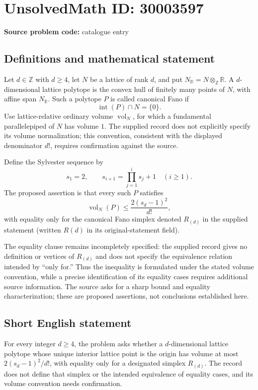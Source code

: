 \documentclass[11pt]{article}
\newcommand{\Z}{\mathbb{Z}}
\newcommand{\R}{\mathbb{R}}
\begin{document}
\section*{UnsolvedMath ID: 30003597}
\textbf{Source problem code:} catalogue entry
\subsection{Definitions and mathematical statement}
Let \(d\in\Z\) with \(d\geq4\), let \(N\) be a lattice of rank \(d\), and put \(N_{\R}=N\otimes_{\Z}\R\). A \(d\)-dimensional lattice polytope is the convex hull of finitely many points of \(N\), with affine span \(N_{\R}\). Such a polytope \(P\) is called canonical Fano if
\[
\operatorname{int}(P)\cap N=\{0\}.
\]
Use lattice-relative ordinary volume \(\operatorname{vol}_N\), for which a fundamental parallelepiped of \(N\) has volume \(1\). The supplied record does not explicitly specify its volume normalization; this convention, consistent with the displayed denominator \(d!\), requires confirmation against the source.

Define the Sylvester sequence by
\[
s_1=2,\qquad s_{i+1}=\prod_{j=1}^{i}s_j+1\quad(i\geq1).
\]
The proposed assertion is that every such \(P\) satisfies
\[
\operatorname{vol}_N(P)\leq\frac{2(s_d-1)^2}{d!},
\]
with equality only for the canonical Fano simplex denoted \(R_{(d)}\) in the supplied statement (written \(R(d)\) in its original-statement field).

The equality clause remains incompletely specified: the supplied record gives no definition or vertices of \(R_{(d)}\) and does not specify the equivalence relation intended by ``only for.'' Thus the inequality is formulated under the stated volume convention, while a precise identification of its equality cases requires additional source information. The source asks for a sharp bound and equality characterization; these are proposed assertions, not conclusions established here.
\subsection{Short English statement}
For every integer \(d\geq4\), the problem asks whether a \(d\)-dimensional lattice polytope whose unique interior lattice point is the origin has volume at most \(2(s_d-1)^2/d!\), with equality only for a designated simplex \(R_{(d)}\). The record does not define that simplex or the intended equivalence of equality cases, and its volume convention needs confirmation.
\end{document}
